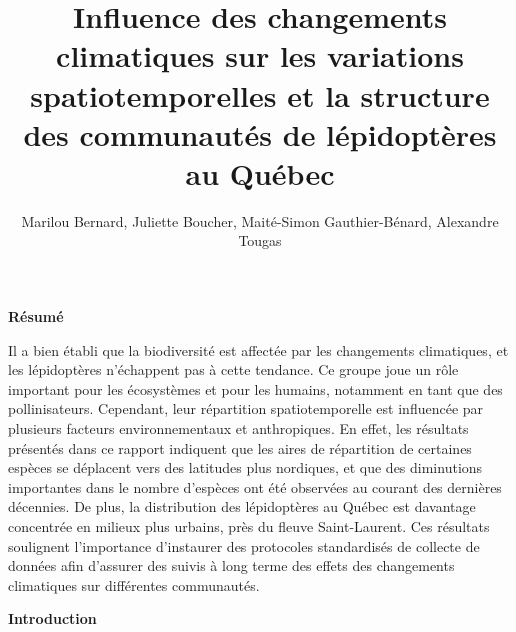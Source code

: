 \documentclass[9pt,twocolumn,twoside,]{pnas-new}
\title{Influence des changements climatiques sur les variations
spatiotemporelles et la structure des communautés de lépidoptères au
Québec}
\author[Université de Sherbrooke, Département de biologie,
BIO500]{Marilou Bernard, Juliette Boucher, Maité-Simon Gauthier-Bénard,
Alexandre Tougas}
\begin{document}
\verticaladjustment{-2pt}



\maketitle
\thispagestyle{firststyle}


\acknow{}

\textbf{Résumé}

Il a bien établi que la biodiversité est affectée par les changements
climatiques, et les lépidoptères n'échappent pas à cette tendance. Ce
groupe joue un rôle important pour les écosystèmes et pour les humains,
notamment en tant que des pollinisateurs. Cependant, leur répartition
spatiotemporelle est influencée par plusieurs facteurs environnementaux
et anthropiques. En effet, les résultats présentés dans ce rapport
indiquent que les aires de répartition de certaines espèces se déplacent
vers des latitudes plus nordiques, et que des diminutions importantes
dans le nombre d'espèces ont été observées au courant des dernières
décennies. De plus, la distribution des lépidoptères au Québec est
davantage concentrée en milieux plus urbains, près du fleuve
Saint-Laurent. Ces résultats soulignent l'importance d'instaurer des
protocoles standardisés de collecte de données afin d'assurer des suivis
à long terme des effets des changements climatiques sur différentes
communautés.

\textbf{Introduction}
\end{document}

